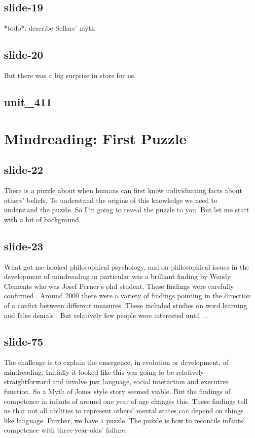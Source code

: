 \documentclass[12pt,\papersize]{extarticle}
\begin{document}
 
\subsection{slide-19}
*todo*: describe Sellars' myth
 
 
\subsection{slide-20}
But there was a big surprise in store for us.
 
 
\subsection{unit\_411}
 
\section{Mindreading: First Puzzle}
 
 
\subsection{slide-22}
There is a puzzle about when humans can first know individuating facts about others' beliefs.
To understand the origins of this knowledge we need to understand the puzzle.
So I'm going to reveal the puzzle to you. But let me start with a bit of background.
 
 
\subsection{slide-23}
What got me hooked philosophical psychology, and on philosophical issues in the development of mindreading in particular was a brilliant finding by Wendy Clements who was Josef Perner's phd student.
These findings were carefully confirmed \citep{Clements:2000nc,Garnham:2001ql,Ruffman:2001ng}.
Around 2000 there were a variety of findings pointing in the direction of a confict between different measures.
These included studies on word learning \citep{Carpenter:2002gc,Happe:2002sr} and false denials \citep{Polak:1999xr}.
But relatively few people were interested until ...
 
 
\subsection{slide-75}
The challenge is to explain the emergence, in evolution or development, of mindreading.
Initially it looked like this was going to be relatively straightforward and involve just language, social interaction and executive function.
So a Myth of Jones style story seemed viable.
But the findings of competence in infants of around one year of age changes this.
These findings tell us that not all abilities to represent others' mental states can depend on things like language.
Further, we have a puzzle.
The puzzle is how to reconcile infants' competence with three-year-olds' failure.
 
\end{document}
